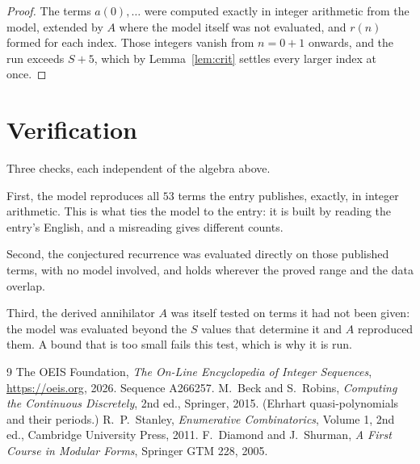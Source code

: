 \documentclass[11pt,a4paper]{article}
\theoremstyle{plain}
\theoremstyle{definition}
\begin{document}
\begin{proof}
The terms $a(0),\dots$ were computed exactly in integer arithmetic from the model, extended by
$A$ where the model itself was not evaluated, and $r(n)$ formed for each index. Those integers
vanish from $n=0+1$ onwards, and the run exceeds $S+5$, which by
Lemma~\ref{lem:crit} settles every larger index at once.
\end{proof}

\section{Verification}

Three checks, each independent of the algebra above.

First, the model reproduces all $53$ terms the entry publishes, exactly, in integer
arithmetic. This is what ties the model to the entry: it is built by reading the entry's
English, and a misreading gives different counts.

Second, the conjectured recurrence was evaluated directly on those published terms, with no
model involved, and holds wherever the proved range and the data overlap.

Third, the derived annihilator $A$ was itself tested on terms it had not been given: the model
was evaluated beyond the $S$ values that determine it and $A$ reproduced them. A bound that is
too small fails this test, which is why it is run.

\begin{thebibliography}{9}
 The OEIS Foundation, \emph{The On-Line Encyclopedia of Integer
Sequences}, \url{https://oeis.org}, 2026. Sequence A266257.
 M.~Beck and S.~Robins, \emph{Computing the Continuous Discretely},
2nd ed., Springer, 2015. (Ehrhart quasi-polynomials and their periods.)
 R.~P.~Stanley, \emph{Enumerative Combinatorics}, Volume 1, 2nd ed.,
Cambridge University Press, 2011.
 F.~Diamond and J.~Shurman, \emph{A First Course in Modular Forms},
Springer GTM 228, 2005.
\end{thebibliography}
\end{document}
